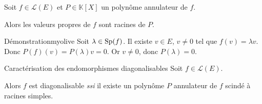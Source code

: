     \begin{prop}{}{}
        Soit $f \in \mathcal{L}(E)$ et $P \in \mathbb{K}[X]$ un polynôme annulateur de $f$.

        Alors les valeurs propres de $f$ sont racines de $P$.
    \end{prop}

    \begin{demo}{Démonstration}{myolive}
        Soit $\lambda \in \operatorname{Sp}(f)$. Il existe $v \in E$, $v \neq 0$ tel que $f(v) = \lambda v$. Donc $P(f)(v) = P(\lambda)v = 0$. Or $v \neq 0$, donc $P(\lambda) = 0$.
    \end{demo}

    \begin{theo}{Caractérisation des endomorphismes diagonalisables}{}
        Soit $f \in \mathcal{L}(E)$.

        Alors $f$ est diagonalisable \textit{ssi} il existe un polynôme $P$ annulateur de $f$ scindé à racines simples.
    \end{theo}


